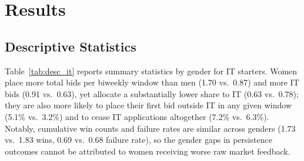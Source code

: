 \documentclass[12pt]{article}
\begin{document}
\section{Results}

\subsection{Descriptive Statistics}

Table~\ref{tab:desc_it} reports summary statistics by gender for IT starters. Women place more total bids per biweekly window than men (1.70 vs.\ 0.87) and more IT bids (0.91 vs.\ 0.63), yet allocate a substantially lower share to IT (0.63 vs.\ 0.78); they are also more likely to place their first bid outside IT in any given window (5.1\% vs.\ 3.2\%) and to cease IT applications altogether (7.2\% vs.\ 6.3\%). Notably, cumulative win counts and failure rates are similar across genders (1.73 vs.\ 1.83 wins, 0.69 vs.\ 0.68 failure rate), so the gender gaps in persistence outcomes cannot be attributed to women receiving worse raw market feedback.
\end{document}

